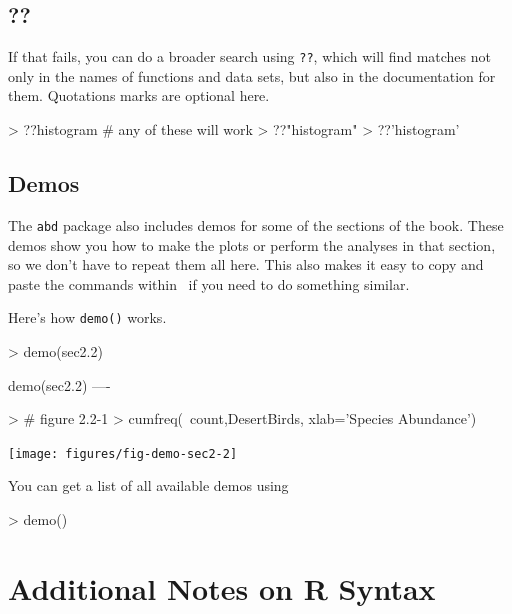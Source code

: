 \subsection{??}
If that fails, you can do a broader search using \verb!??!, which will find matches not only
in the names of functions and data sets, but also in the documentation for them.
Quotations marks are optional here.

\begin{Schunk}
\begin{Sinput}
> ??histogram                  # any of these will work
> ??"histogram"  
> ??'histogram'  
\end{Sinput}
\end{Schunk}

\subsection{Demos}
The \verb!abd! package also includes demos for some of the sections of the book.
These demos show you how to make the plots or perform the analyses in that section,
so we don't have to repeat them all here.  This also makes it easy to copy and paste
the commands within \Rstudio\ if you need to do something similar.

Here's how \verb!demo()! works.
\begin{center}
\begin{Schunk}
\begin{Sinput}
> demo(sec2.2)
\end{Sinput}
\begin{Soutput}
	demo(sec2.2)
	---- ~~~~~~

> # figure 2.2-1
> cumfreq(~count,DesertBirds, xlab='Species Abundance')
\end{Soutput}
\end{Schunk}
\texttt{[image: figures/fig-demo-sec2-2]}
\end{center}
\vspace{-8mm}
You can get a list of all available demos using

\begin{Schunk}
\begin{Sinput}
> demo()
\end{Sinput}
\end{Schunk}

\vspace{-8mm}
\section{Additional Notes on R Syntax}


